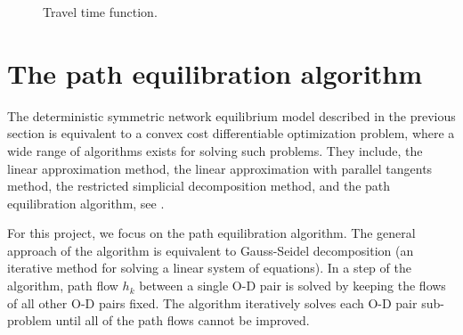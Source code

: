 \begin{figure}[H]
    \centering
    \caption{Travel time function.}
    \label{fig:flowfunction}
\end{figure}

\section{The path equilibration algorithm}
The deterministic symmetric network equilibrium model described in the previous section is equivalent to a convex cost differentiable optimization problem,
where a wide range of algorithms exists for solving such problems.
They include, the linear approximation method,
the linear approximation with parallel tangents method,
the restricted simplicial decomposition method,
and the path equilibration algorithm,
see \citet{Florian}.

For this project,
we focus on the path equilibration algorithm.
The general approach of the algorithm is equivalent to
Gauss-Seidel decomposition (an iterative method for solving a linear system of equations).
In a step of the algorithm,
path flow $h_k$ between a single O-D pair is solved by keeping the flows of all other O-D pairs fixed.
The algorithm iteratively solves each O-D pair sub-problem until all of the path flows cannot be improved.

